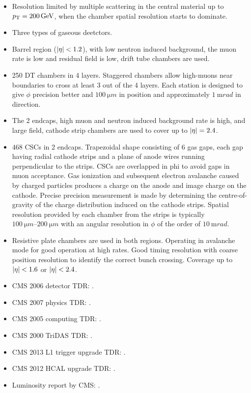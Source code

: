 \begin{itemize}
    \item Resolution limited by multiple scattering in the central material
        up to $p_{\text{T}}=\SI{200}{GeV}$, when the chamber spatial resolution starts
        to dominate.
    \item Three types of gaseous deetctors.
    \item Barrel region (${|\eta|<1.2}$), with low neutron induced background,
        the muon rate is low and residual field is low, drift tube chambers are
        used.
    \item 250 DT chambers in 4 layers. Staggered chambers allow high-\pt muons
        near boundaries to cross at least 3 out of the 4 layers. Each station is
        designed to give $\phi$ precision better and ${\SI{100}{\micro m}}$ in
        position and approximately ${\SI{1}{\milli rad}}$ in direction.
    \item The 2 endcaps, high muon and neutron induced background rate is high,
        and large field, cathode strip chambers are used to cover up to
        ${{|\eta|}=2.4}$.
    \item 468 CSCs in 2 endcaps. Trapezoidal shape consisting of 6 gas gaps,
        each gap having radial cathode strips and a plane of anode wires running
        perpendicular to the strips. CSCs are overlapped in phi to avoid gaps
        in muon acceptance. Gas ionization and subsequent electron avalanche
        caused by charged particles produces a charge on the anode and image
        charge on the cathode. Precise precision measurement is made by
        determining the centre-of-gravity of the charge distribution induced on
        the cathode strips. Spatial resolution provided by each chamber from the
        strips is typically ${\SIrange{100}{200}{\micro m}}$ with an angular
        resolution in $\phi$ of the order of ${\SI{10}{\milli rad}}$.
    \item Resistive plate chambers are used in both regions. Operating
        in avalanche mode for good operation at high rates. Good timing
        resolution with coarse position resolution to identify the correct
        bunch crossing. Coverage up to ${|\eta|<1.6}$ or ${|\eta|<2.4}$.
\end{itemize}

    \begin{itemize}
        \item CMS 2006 detector TDR: \cite{Bayatian:922757}.
        \item CMS 2007 physics TDR: \cite{Bayatian:942733}.
        \item CMS 2005 computing TDR: \cite{Bayatyan:838359}.
        \item CMS 2000 TriDAS TDR: \cite{Bayatyan:706847}.
        \item CMS 2013 L1 trigger upgrade TDR: \cite{Tapper:1556311}.
        \item CMS 2012 HCAL upgrade TDR: \cite{Mans:1481837}.
        \item Luminosity report by CMS: \cite{CMS-PAS-LUM-17-001}.
    \end{itemize}


